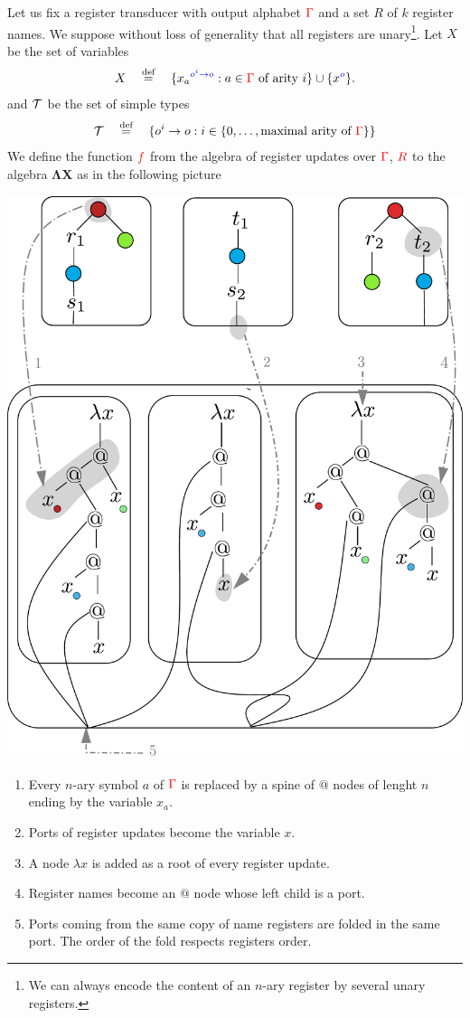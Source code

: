 Let us fix a register transducer with output alphabet ${\color{red}{\Gamma}}$ and a set $R$ of $k$ register names. 
We suppose without loss of generality that all registers are unary\footnote{We can always encode the content of an $n$-ary register by several unary registers.}. Let $X$ be the set of variables 
\begin{align*}
X  \quad \stackrel{\text{def}}= \quad \{{x_a}^{\color{blue}{o^i \to o}} : a \in {\color{red}{\Gamma}} \text{ of arity $i$}\} \cup \{{x}^{\color{blue}{o}}\}.
\end{align*}
and ${\mathcal T}$ be the set of simple types 
\begin{align*}
    {\mathcal T} \quad \stackrel{\text{def}}= \quad \{o^i \to o : i \in \{0,\ldots,\text{maximal arity of ${\color{red}{\Gamma}}$}\}\}
\end{align*}
We define the function ${\color{red}{f}}$ from the algebra of register updates over ${\color{red}{\Gamma}}$, ${\color{red}{R}}$ to  the algebra $\mathbf{\Lambda X}$ as in the following picture
\begin{center}
\includegraphics[scale=.4]{embedding.pdf}
\end{center}
\begin{enumerate}
\item Every $n$-ary symbol $a$ of ${\color{red}{\Gamma}}$ is replaced by a spine of $@$ nodes of lenght $n$ ending by the variable $x_a$.
\item Ports of register updates become the variable $x$.
\item A node $\lambda x$ is added as a root of every register update.
\item Register names become an $@$ node whose left child is a port. 
\item Ports coming from the same copy of name registers are folded in the same port. The order of the fold respects registers order.
\end{enumerate}

